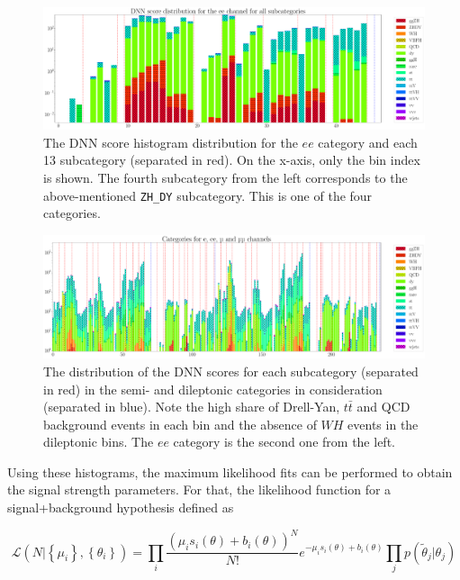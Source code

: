 \begin{figure}[h!]
	\centering
	\includegraphics[width=\linewidth]{figures/analysis/cond1.pdf}
	\caption{The DNN score histogram distribution for the $ee$ category and each 13 subcategory (separated in red). On the x-axis, only the bin index is shown. The fourth subcategory from the left corresponds to the above-mentioned \texttt{ZH\_DY} subcategory. This is one of the four categories.}
	\label{fig:ee_dnn_score}
\end{figure}

\begin{figure}[h!]
	\centering
	\includegraphics[width=1.1\linewidth]{figures/analysis/cond4_notOrdered.pdf}
	\caption{The distribution of the DNN scores for each subcategory (separated in red) in the semi- and dileptonic categories in consideration (separated in blue). Note the high share of Drell-Yan, $t\bar{t}$ and QCD background events in each bin and the absence of $WH$ events in the dileptonic bins. The $ee$ category is the second one from the left.}
	\label{fig:conditions}
\end{figure}


Using these histograms, the maximum likelihood fits can be performed to obtain the signal strength parameters. For that, the likelihood function for a signal+background hypothesis defined as

\begin{equation*}
	\mathcal{L}(N | \left\{\mu_i\right\} , \left\{\theta_i\right\}) = \prod\limits_i \frac{(\mu_is_i(\theta)+b_i(\theta))^N}{N!}e^{-\mu_is_i(\theta) + b_i(\theta)} \prod\limits_j p(\tilde{\theta}_j | \theta_j)
\end{equation*}

